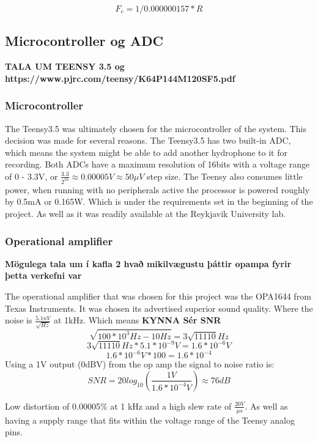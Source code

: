 \begin{equation}
F_c = 1 / 0.000000157 * R  
\label{eq:fchydro}
\end{equation}




\subsection{Microcontroller og ADC}

\textbf{TALA UM TEENSY 3.5 og https://www.pjrc.com/teensy/K64P144M120SF5.pdf
}
\subsubsection{Microcontroller}
The Teensy3.5 was ultimately chosen for the microcontroller of the system.
This decision was made for several reasons.
The Teensy3.5 has two built-in ADC, which means the system might be able to add another hydrophone to it for recording.
Both ADCs have a maximum resolution of 16bits with a voltage range of 0 - 3.3V, or $\frac{3.3}{2^16} \approx 0.00005V \approx 50\mu V$ step size.
The Teensy also consumes little power, when running with no peripherals active the processor is powered roughly by 0.5mA or 0.165W.
Which is under the requirements set in the beginning of the project.
As well as it was readily available at the Reykjavik University lab.

\subsubsection{Operational amplifier}
\textbf{Mögulega tala um í kafla 2 hvað mikilvægustu þáttir opampa fyrir þetta verkefni var}

The operational amplifier that was chosen for this project was the OPA1644 from Texas Instruments.
It was chosen its advertised superior sound quality.
Where the noise is $\frac{5.1nV}{\sqrt{Hz}}$ at 1kHz.
Which means 
\textbf{KYNNA Sér SNR}
$$\sqrt{100*10^3Hz - 10Hz} = 3\sqrt{11110}Hz$$
$$3\sqrt{11110}Hz*5.1*10^{-9}V = 1.6*10^{-6}V$$
$$ 1.6*10^{-6}V * 100 = 1.6*10^{-4}$$
Using a 1V output (0dBV) from the op amp the signal to noise ratio is:
$$SNR = 20log_{10}(\frac{1V}{1.6*10^{-4}V}) \approx 76dB$$

Low distortion of 0.00005\% at 1 kHz and a high slew rate of $\frac{20V}{\mu s}$.
As well as having a supply range that fits within the voltage range of the Teensy analog pins.
\cite{noauthor_opa164x_nodate}

